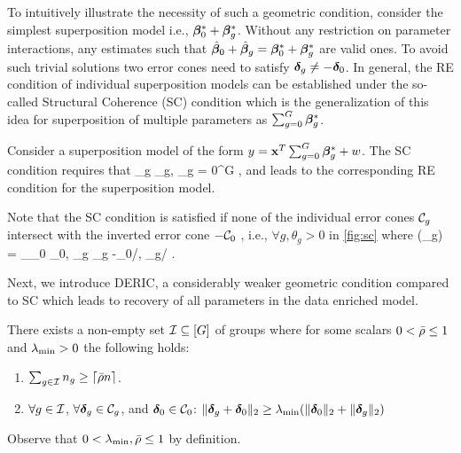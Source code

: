 To intuitively illustrate the necessity of such a geometric condition, consider the simplest superposition model i.e., $\boldsymbol{\beta}^*_0 + \boldsymbol{\beta}^*_g$. Without any restriction on parameter interactions, any estimates such that $\hat{\boldsymbol{\beta}}_0 + \hat{\boldsymbol{\beta}}_g = \boldsymbol{\beta}^*_0 + \boldsymbol{\beta}^*_g$ are valid ones. To avoid such trivial solutions two error cones need to satisfy $\boldsymbol{\delta}_g \neq -\boldsymbol{\delta}_0$. In general, the RE condition of individual superposition models can be established under the so-called Structural Coherence (SC) condition \cite{guba16, mctr13} which is the generalization of this idea for superposition of multiple parameters as $\sum_{g = 0}^{G} \boldsymbol{\beta}^*_g$.
 
\begin{definition} \label{scc}
	Consider a superposition model of the form $y = \mathbf{x}^T \sum_{g = 0}^{G} \boldsymbol{\beta}^*_g + w$. The SC condition requires that
	\be 
	\nr 
	\forall \ddelta_g \in \cC_g, \exists \lambda \quad  {}  \quad {} \geq  \lambda \sum_{g = 0}^{G}  ,
	\ee  
	and leads to the corresponding RE condition for the superposition model.
\end{definition}

\begin{remark}
	Note that the SC condition is satisfied if none of the individual error cones $\cC_g$ intersect with the inverted error cone $-\cC_0$ \cite{guba16, trop15}, i.e., $\forall g, \theta_g > 0$ in \cref{fig:sc} where 
	\be 
	\nr 
	\cos(\theta_g) = \sup_{\ddelta_0 \in \cC_0, \ddelta_g \in \cC_g} -\langle \ddelta_0/, \ddelta_g/ \rangle.
	\ee
\end{remark}
Next, we introduce DERIC, a considerably weaker geometric condition compared to SC which leads to recovery of all parameters in the data enriched model. 
\begin{definition}  \label{incodef}
	There exists a non-empty set $\cI\subseteq [G]$ of groups where for some scalars $0 < \bar{\rho}\leq 1$ and $\lambda_{\min}>0$ the following holds:
	\begin{enumerate}
		\item $\sum_{g\in \cI} n_g\geq \lceil \ratio n\rceil$.
		\item $\forall g \in \cI$, $\forall \ddelta_g \in \cC_g$, and $\ddelta_0\in\cC_0$: $\|\boldsymbol{\delta}_g+\boldsymbol{\delta}_0\|_{2}\geq \lambda_{\min} (\|\boldsymbol{\delta}_0\|_{2}+\|\boldsymbol{\delta}_g\|_{2})$
	\end{enumerate}
	Observe that $0 < \lambda_{\min},\bar{\rho}\leq 1$ by definition.
\end{definition}

